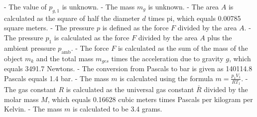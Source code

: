 - The value of \( p_{g,1} \) is unknown.
- The mass \( m_g \) is unknown.
- The area \( A \) is calculated as the square of half the diameter \( d \) times pi, which equals 0.00785 square meters.
- The pressure \( p \) is defined as the force \( F \) divided by the area \( A \).
- The pressure \( p_1 \) is calculated as the force \( F \) divided by the area \( A \) plus the ambient pressure \( p_{\text{amb}} \).
- The force \( F \) is calculated as the sum of the mass of the object \( m_k \) and the total mass \( m_{ges} \) times the acceleration due to gravity \( g \), which equals 3491.7 Newtons.
- The conversion from Pascals to bar is given as 140114.8 Pascals equals 1.4 bar.
- The mass \( m \) is calculated using the formula \( m = \frac{p_1 V_1}{R T_1} \).
- The gas constant \( R \) is calculated as the universal gas constant \( \bar{R} \) divided by the molar mass \( M \), which equals 0.16628 cubic meters times Pascals per kilogram per Kelvin.
- The mass \( m \) is calculated to be 3.4 grams.